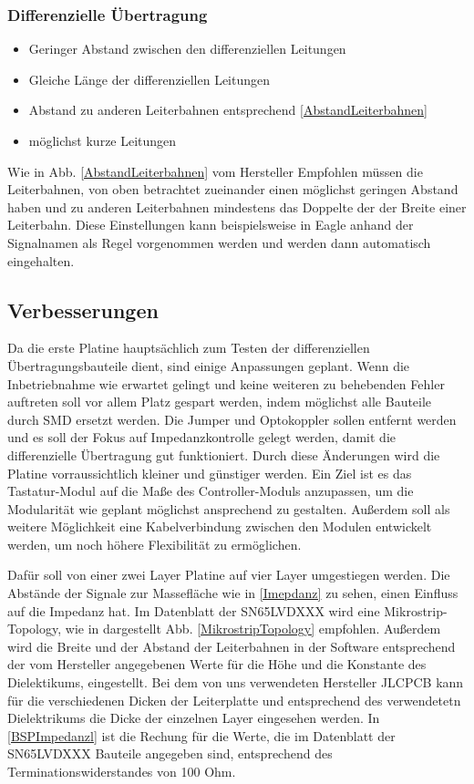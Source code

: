 \subsubsection{Differenzielle Übertragung}



\begin{itemize}
	\item Geringer Abstand zwischen den differenziellen Leitungen
	\item Gleiche Länge der differenziellen Leitungen
	\item Abstand zu anderen Leiterbahnen entsprechend \ref{AbstandLeiterbahnen}
	\item möglichst kurze Leitungen 
\end{itemize}


Wie in Abb. \ref{AbstandLeiterbahnen} vom Hersteller Empfohlen müssen die Leiterbahnen, von oben betrachtet zueinander einen möglichst geringen Abstand haben und zu anderen Leiterbahnen mindestens das Doppelte der der Breite einer Leiterbahn. Diese Einstellungen kann beispielsweise in Eagle anhand der Signalnamen als Regel vorgenommen werden und werden dann automatisch eingehalten. 

\subsection{Verbesserungen}
Da die erste Platine hauptsächlich zum Testen der differenziellen Übertragungsbauteile dient, sind einige Anpassungen geplant. \newline
Wenn die Inbetriebnahme wie erwartet gelingt und keine weiteren zu behebenden Fehler auftreten soll vor allem Platz gespart werden, indem möglichst alle Bauteile durch SMD ersetzt werden. Die Jumper und Optokoppler sollen entfernt werden und es soll der Fokus auf Impedanzkontrolle gelegt werden, damit die differenzielle Übertragung gut funktioniert. \newline
Durch diese Änderungen wird die Platine vorraussichtlich kleiner und günstiger werden. Ein Ziel ist es das Tastatur-Modul auf die Maße des Controller-Moduls anzupassen, um die Modularität wie geplant möglichst ansprechend zu gestalten. \newline
Außerdem soll als weitere Möglichkeit eine Kabelverbindung zwischen den Modulen entwickelt werden, um noch höhere Flexibilität zu ermöglichen.

Dafür soll von einer zwei Layer Platine auf vier Layer umgestiegen werden. Die Abstände der Signale zur Massefläche wie in \ref{Imepdanz} zu sehen, einen Einfluss auf die Impedanz hat. Im Datenblatt der SN65LVDXXX wird eine Mikrostrip-Topology, wie in dargestellt Abb. \ref{MikrostripTopology} empfohlen. Außerdem wird die Breite und der Abstand der Leiterbahnen in der Software entsprechend der vom Hersteller angegebenen Werte für die Höhe und die Konstante des Dielektikums, eingestellt. Bei dem von uns verwendeten Hersteller JLCPCB kann für die verschiedenen Dicken der Leiterplatte und entsprechend des verwendetetn Dielektrikums die Dicke der einzelnen Layer eingesehen werden. 
In \ref{BSPImpedanzl} ist die Rechung für die Werte, die im Datenblatt der SN65LVDXXX Bauteile angegeben sind, entsprechend des Terminationswiderstandes von 100 Ohm.


